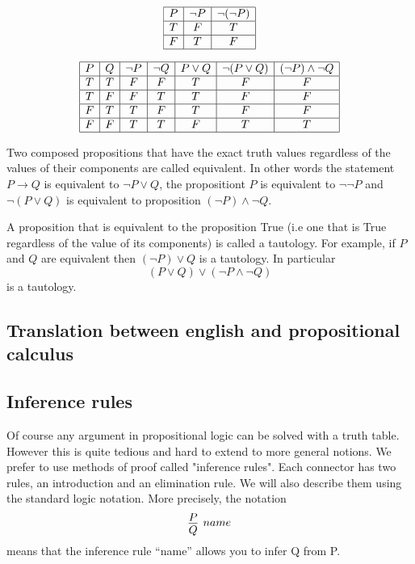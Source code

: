 \begin{itemize}
$$\begin{array}{|c|c|c|}\hline P & \neg P & \neg (\neg P) \\\hline T & F & T \\\hline F & T & F \\\hline\end{array}$$

$$\begin{array}{|c|c|c|c|c|c|c|}\hline P & Q & \neg P & \neg Q & P\lor Q & \neg ( P \lor Q) & (\neg P)\land \neg Q \\ \hline T & T & F &F & T & F & F \\\hline T & F & F &T & T &F & F \\\hline F & T & T & F & T & F & F \\\hline F & F & T &T&F& T & T\\ \hline\end{array}$$


Two composed propositions that have the exact truth values regardless of the values of their components are called equivalent. In other words the statement $P \rightarrow Q$ is equivalent to $\neg P \lor Q$, the propositiont $P$ is equivalent to  $\neg \neg P$ and  $ \neg ( P \lor Q)$ is equivalent to proposition $(\neg P)\land \neg Q $.

A proposition that is equivalent to the proposition True (i.e one that is True regardless of the value of its components) is called a tautology. For example, if $P$ and $Q$ are equivalent then $(\neg P) \lor Q$ is a tautology. In particular  $$ ( P \lor Q) \lor (\neg P\land \neg Q)$$ is a tautology. 

\subsection{Translation between english and propositional calculus}

\subsection{Inference rules}

Of course any argument in propositional logic can be solved with a truth table. However this is quite tedious and hard to extend to more general notions. We prefer to use methods of proof called "inference rules".
Each connector has two rules, an introduction and an elimination rule. We will also describe them using the standard logic notation. More precisely, the notation
$$\infer[name]{Q}{P}$$
means that the inference rule ``name'' allows you to infer Q from P.




\end{itemize}
